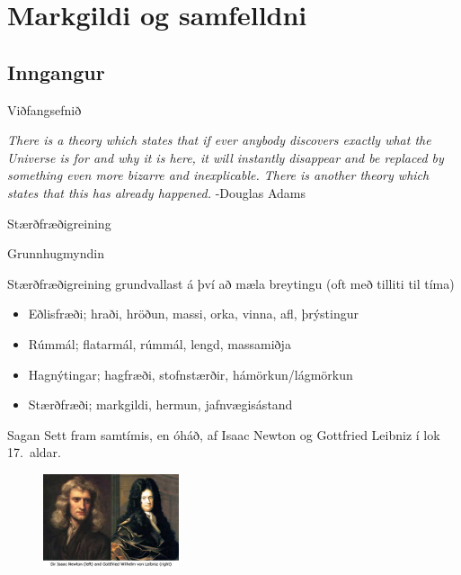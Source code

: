 \documentclass[icelandic,a4paper,12pt]{article}
\date{29. ágúst 2015}
\begin{document}
\begin{frame}
	\maketitle
\end{frame}
\section*{Markgildi og samfelldni}
\subsection*{Inngangur}
\begin{frame}{Viðfangsefnið}
 \begin{block}{}
 \emph{There is a theory which states that if ever anybody discovers exactly what the Universe is for and 
  why it is here, it will instantly disappear and be replaced by something even more bizarre and inexplicable. 
  There is another theory which states that this has already happened.} \hfill -Douglas Adams
 \end{block}

\end{frame}

\begin{frame}{Stærðfræðigreining}

\begin{block}{Grunnhugmyndin}

 Stærðfræðigreining grundvallast á því að mæla breytingu (oft með tilliti til tíma)
 \begin{itemize}
  \item Eðlisfræði; hraði, hröðun, massi, orka, vinna, afl, þrýstingur
  \item Rúmmál; flatarmál, rúmmál, lengd, massamiðja
  \item Hagnýtingar; hagfræði, stofnstærðir, hámörkun/lágmörkun 
  \item Stærðfræði; markgildi, hermun, jafnvægisástand
 \end{itemize}
  \end{block}

\pause


\begin{block}{Sagan}
 Sett fram samtímis, en óháð, af Isaac Newton og Gottfried Leibniz í lok 17.~aldar.
\end{block}

\begin{figure}
 \includegraphics[width=4cm]{./myndir/kafli01/01_NewtonLeibniz.jpg}
\end{figure}



\end{frame}
\end{document}
